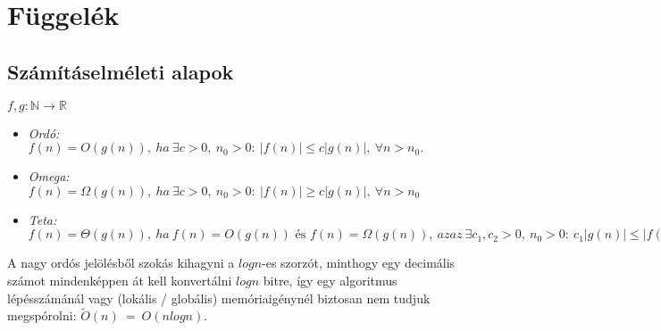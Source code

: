 \appendix
\chapter*{\texorpdfstring{\protect\hypertarget{appendix}{Függelék}}{}}
\setcounter{chapter}{6}  %
\setcounter{equation}{0} %


  \section{Számításelméleti alapok}
  \begin{definition} 
    $f,g: \mathbb{N} \rightarrow \mathbb{R}$
    \begin{itemize}
    \item \emph{ Ordó:} $f(n)=O(g(n)),~ha~ \exists c > 0,~n_{0} > 0:~|f(n)| \leq c|g(n)|,~\forall n>n_{0}.$
    \item \emph{ Omega:} $f(n)=\Omega(g(n)),~ha~ \exists c > 0,~n_{0} > 0:~|f(n)| \geq c|g(n)|,~\forall n>n_{0}$
    \item \emph{ Teta:} $f(n)=\Theta(g(n)),~ha~ f(n)=O(g(n)) \text{ és } f(n)=\Omega(g(n)),~azaz~ \exists c_{1},c_{2} > 0,~n_{0} > 0:~c_{1}|g(n)| \leq |f(n)| \leq c_{2}|g(n)|,~\forall n>n_{0}$
    \end{itemize}
  \end{definition}

  \begin{note}
    A nagy ordós jelölésből szokás kihagyni a $logn$-es szorzót, minthogy egy decimális számot mindenképpen át kell konvertálni $logn$ bitre, így egy algoritmus lépésszámánál vagy (lokális / globális) memóriaigénynél biztosan nem tudjuk megspórolni: $\tilde{O}(n)~=~O(nlogn)$.
  \end{note}


